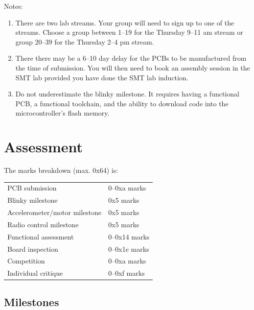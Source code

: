 \documentclass[11pt, a4paper]{article}
\begin{document}
Notes:
%
\begin{enumerate}
\item There are two lab streams.  Your group will need to sign up to
  one of the streams.  Choose a group between 1--19 for the Thursday
  9--11 am stream or group 20--39 for the Thursday 2--4 pm stream.

\item There there may be a 6--10 day delay for the PCBs to be
  manufactured from the time of submission.  You will then need to
  book an assembly session in the SMT lab provided you have done the
  SMT lab induction.

\item Do not underestimate the blinky milestone.  It requires having a
  functional PCB, a functional toolchain, and the ability to download
  code into the microcontroller's flash memory.

\end{enumerate}


\section{Assessment}

The marks breakdown (max. 0x64) is:
%
\begin{flushleft}
  \begin{tabular}{ll}
    PCB submission & 0--0xa marks\\
    Blinky milestone  & 0x5 marks\\
    Accelerometer/motor milestone  & 0x5 marks\\
    Radio control milestone  & 0x5 marks\\
    Functional assessment & 0--0x14 marks \\
    Board inspection & 0--0x1e marks \\
    Competition & 0--0xa marks \\
    Individual critique & 0--0xf marks \\
  \end{tabular}

\end{flushleft}

\subsection{Milestones}
\end{document}
